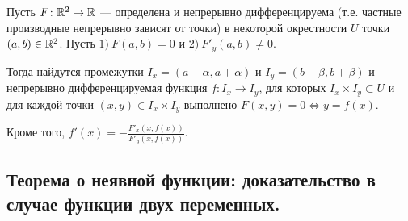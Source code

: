 \documentclass[a4paper]{article}
\theoremstyle{named}
\begin{document}
    \begin{theorem*}
        Пусть $F\colon \mathbb{R}^2\to \mathbb{R}$ --- определена и непрерывно дифференцируема (т.е. частные производные непрерывно зависят от точки) в некоторой окрестности $U$ точки $(a,b)\in \mathbb{R}^2$. Пусть $1)\ F(a,b)=0$ и  $2)\ F'_y(a,b)\ne0$.

        Тогда найдутся промежутки $I_x = (a-\alpha, a+\alpha)$ и $I_y=(b-\beta, b+\beta)$ и непрерывно дифференцируемая функция $f\colon I_x\to I_y$, для которых $I_x\times I_y\subset U$ и для каждой точки $(x,y)\in I_x\times I_y$
        выполнено $F(x,y)=0 \Leftrightarrow y=f(x)$.

        Кроме того, $f'(x)=-\frac{F'_x(x,f(x))}{F'_y(x,f(x))}$.
    \end{theorem*}

    \subsection{Теорема о неявной функции: доказательство в случае функции двух переменных.}
\end{document}
